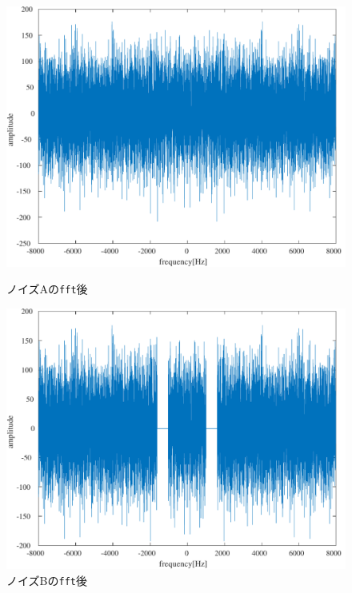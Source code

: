 \begin{figure}[H]
    \centering
    \begin{minipage}{.45\textwidth}
        \centering
        \includegraphics[keepaspectratio,width=\textwidth]{../../Figures/04_20_Afft.pdf}
        \caption{ノイズAの\texttt{fft}後}
        \label{fig:ノイズAのFFT後}
    \end{minipage}
    \hspace{1em}
    \begin{minipage}{.45\textwidth}
        \centering
        \includegraphics[keepaspectratio,width=\textwidth]{../../Figures/04_21_Bfft.pdf}
        \caption{ノイズBの\texttt{fft}後}
        \label{fig:ノイズBのFFT後}
    \end{minipage}
\end{figure}

